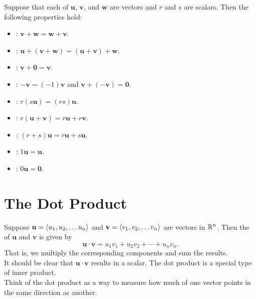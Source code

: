 Suppose that each of \(\mathbf{u}\), \(\mathbf{v}\), and \(\mathbf{w}\) are vectors and \(r\) and \(s\) are scalars. Then the following properties hold:
\begin{itemize}
    \item {}: \(\mathbf{v} + \mathbf{w} = \mathbf{w} + \mathbf{v}\).
    \item {}: \(\mathbf{u} + (\mathbf{v} + \mathbf{w}) = (\mathbf{u} + \mathbf{v}) + \mathbf{w}\).
    \item {}: \(\mathbf{v} + \mathbf{0} = \mathbf{v}\).
    \item {}: \(-\mathbf{v} = (-1)\mathbf{v}\) and \(\mathbf{v} + (-\mathbf{v}) = \mathbf{0}\).
    \item {}: \(r(s\mathbf{u})= (rs)\mathbf{u}\).
    \item {}: \(r(\mathbf{u} + \mathbf{v}) = r\mathbf{u} + r\mathbf{v}\).
    \item {}: \((r+s)\mathbf{u} = r\mathbf{u} + s\mathbf{u}\).
    \item {}: \(1\mathbf{u} = \mathbf{u}\).
    \item {}: \(0\mathbf{u} = \mathbf{0}\).
\end{itemize}

\newpage

\section{The Dot Product}

Suppose \(\mathbf{u} = \left\langle u_{1},u_{2},\dots u_{n} \right\rangle\) and \(\mathbf{v} = \left\langle v_{1},v_{2},\dots v_{n} \right\rangle\) are vectors in \(\mathbb{R}^{n}\). Then the  of \(\mathbf{u}\) and \(\mathbf{v}\) is given by
\[
    \mathbf{u} \cdot \mathbf{v} = u_{1}v_{1} + u_{2}v_{2} + \cdots + u_{n}v_{n}.
\]
That is, we multiply the corresponding components and sum the results. \\

It should be clear that \(\mathbf{u} \cdot \mathbf{v}\) results in a scalar. The dot product is a special type of inner product. \\

Think of the dot product as a way to measure how much of one vector points in the same direction as another.

